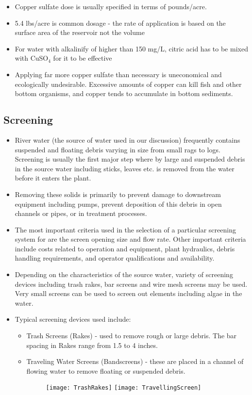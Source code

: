 \begin{itemize}
\begin{itemize}
\item Copper sulfate dose is usually specified in terms of pounds/acre. 
\item 5.4 lbs/acre is common dosage - the rate of application is based on the surface area of the reservoir not the volume
\item For water with alkalinify of higher than 150 mg/L, citric acid has to be mixed with CuSO$_4$ for it to be effective
\item Applying far more copper sulfate than necessary is uneconomical and ecologically undesirable. Excessive amounts of copper can kill fish and other bottom organisms, and copper tends to accumulate in bottom sediments. 
\end{itemize}
\subsection{Screening}
\begin{itemize}
\item River water (the source of water used in our discussion) frequently contains suspended and floating debris varying in size from small rags to logs. Screening is usually the first major step where by large and suspended debris in the source water including sticks, leaves etc. is removed from the water before it enters the plant. 
\item Removing these solids is primarily to prevent damage to downstream equipment including pumps, prevent deposition of this debris in open channels or pipes, or in treatment processes.
\item The most important criteria used in the selection of a particular screening system for are the screen opening size and flow rate. Other important criteria include costs related to operation and equipment, plant hydraulics, debris handling requirements, and operator qualifications and availability. 
\item Depending on the characteristics of the source water, variety of screening devices including trash rakes, bar screens and wire mesh screens may be used. Very small screens can be used to screen out elements including algae in the water.
\item Typical screening devices used include:
\begin{itemize}
\item Trash Screens (Rakes) - used to remove rough or large debris.  The bar spacing in Rakes range from 1.5 to 4 inches.
\item Traveling Water Screens (Bandscreens) - these are placed in a channel of flowing water to remove floating or suspended debris.
\begin{figure}[h]
\begin{center}
\texttt{[image: TrashRakes]}
\texttt{[image: TravellingScreen]}
\end{center}
\end{figure}
\end{itemize}


\end{itemize}
\end{itemize}
